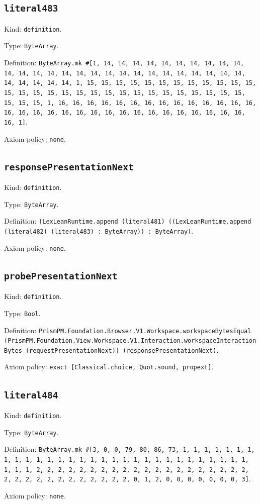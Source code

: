 \documentclass[11pt]{article}
\begin{document}
\subsection*{\texttt{literal483}}
\noindent Kind: \texttt{definition}.\par
\noindent Type: \texttt{ByteArray}.\par
\noindent Definition: \texttt{ByteArray.mk \#[1, 14, 14, 14, 14, 14, 14, 14, 14, 14, 14, 14, 14, 14, 14, 14, 14, 14, 14, 14, 14, 14, 14, 14, 14, 14, 14, 14, 14, 14, 14, 14, 14, 1, 15, 15, 15, 15, 15, 15, 15, 15, 15, 15, 15, 15, 15, 15, 15, 15, 15, 15, 15, 15, 15, 15, 15, 15, 15, 15, 15, 15, 15, 15, 15, 15, 1, 16, 16, 16, 16, 16, 16, 16, 16, 16, 16, 16, 16, 16, 16, 16, 16, 16, 16, 16, 16, 16, 16, 16, 16, 16, 16, 16, 16, 16, 16, 16, 16, 1]}.\par
\noindent Axiom policy: \texttt{none}.\par
\subsection*{\texttt{responsePresentationNext}}
\noindent Kind: \texttt{definition}.\par
\noindent Type: \texttt{ByteArray}.\par
\noindent Definition: \texttt{(LexLeanRuntime.append (literal481) ((LexLeanRuntime.append (literal482) (literal483) : ByteArray)) : ByteArray)}.\par
\noindent Axiom policy: \texttt{none}.\par
\subsection*{\texttt{probePresentationNext}}
\noindent Kind: \texttt{definition}.\par
\noindent Type: \texttt{Bool}.\par
\noindent Definition: \texttt{PrismPM.Foundation.Browser.V1.Workspace.workspaceBytesEqual (PrismPM.Foundation.View.Workspace.V1.Interaction.workspaceInteractionBytes (requestPresentationNext)) (responsePresentationNext)}.\par
\noindent Axiom policy: \texttt{exact [Classical.choice, Quot.sound, propext]}.\par
\subsection*{\texttt{literal484}}
\noindent Kind: \texttt{definition}.\par
\noindent Type: \texttt{ByteArray}.\par
\noindent Definition: \texttt{ByteArray.mk \#[3, 0, 0, 79, 80, 86, 73, 1, 1, 1, 1, 1, 1, 1, 1, 1, 1, 1, 1, 1, 1, 1, 1, 1, 1, 1, 1, 1, 1, 1, 1, 1, 1, 1, 1, 1, 1, 1, 1, 1, 2, 2, 2, 2, 2, 2, 2, 2, 2, 2, 2, 2, 2, 2, 2, 2, 2, 2, 2, 2, 2, 2, 2, 2, 2, 2, 2, 2, 2, 2, 2, 2, 0, 1, 2, 0, 0, 0, 0, 0, 0, 0, 3]}.\par
\noindent Axiom policy: \texttt{none}.\par
\end{document}
